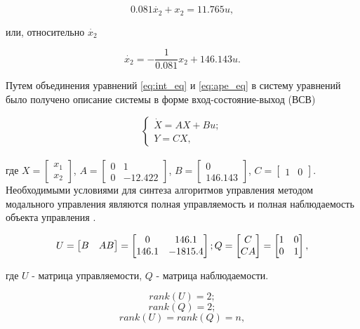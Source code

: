 $$
  0.081\dot{x_2} + x_2 = 11.765u,
$$

или, относительно $\dot{x_2}$

\begin{equation}
  \dot{x_2}=-\frac{1}{0.081}x_2+146.143u.
  \label{eq:ape_eq}
\end{equation}

Путем объединения уравнений \ref{eq:int_eq} и \ref{eq:ape_eq} в систему уравнений было получено
описание системы в форме вход-состояние-выход (ВСВ)

$$
  \begin{cases}
    \dot{X}=AX+Bu;
    \\
    Y=CX,
  \end{cases}
$$\\

где $X=\begin{bmatrix}x_1\\x_2\end{bmatrix}$, $A=\begin{bmatrix}0&1\\0& -12.422\end{bmatrix}$, 
$B=\begin{bmatrix}0\\146.143\end{bmatrix}$, $C=\begin{bmatrix}1&0\end{bmatrix}$.\\

Необходимыми условиями для синтеза алгоритмов управления методом модального управления
являются полная управляемость и полная наблюдаемость объекта управления \cite{МодальноеУправление}.

$$
  U = \begin{bmatrix}B&AB\end{bmatrix} = \begin{bmatrix}0&146.1\\146.1&-1815.4\end{bmatrix};
  \\
  Q = \begin{bmatrix}C\\CA\end{bmatrix} = \begin{bmatrix}1&0\\0&1\end{bmatrix},
$$

где $U$ - матрица управляемости, $Q$ - матрица наблюдаемости.

$$
  rank(U) = 2;
$$
$$
  rank(Q) = 2;
$$
\begin{equation}
  rank(U) = rank(Q) = n,
  \label{eq:modal_check}
\end{equation}

